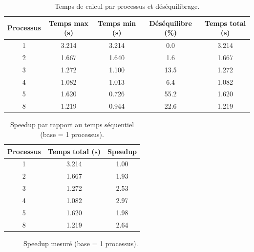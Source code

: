 \documentclass[a4paper,13pt]{book}
\begin{document}
\begin{table}[ht]
  \centering
  \caption{Temps de calcul par processus et déséquilibrage.}
  \label{tab:temps}
  \begin{tabular}{@{}ccccc@{}}
    \toprule
    \textbf{Processus} & \textbf{Temps max (s)} & \textbf{Temps min (s)} & \textbf{Déséquilibre (\%)} & \textbf{Temps total (s)} \\
    \midrule
    1 & 3.214 & 3.214 & 0.0 & 3.214 \\
    \hline
    2 & 1.667 & 1.640 & 1.6 & 1.667 \\
    \hline
    3 & 1.272 & 1.100 & 13.5 & 1.272 \\
    \hline
    4 & 1.082 & 1.013 & 6.4 & 1.082 \\
    \hline
    5 & 1.620 & 0.726 & 55.2 & 1.620 \\
    \hline
    8 & 1.219 & 0.944 & 22.6 & 1.219 \\
    \bottomrule
  \end{tabular}
\end{table}
\begin{table}[ht]
  \centering
  \caption{Speedup par rapport au temps séquentiel (base = 1 processus).}
  \label{tab:speedup}
  \begin{tabular}{@{}ccc@{}}
    \toprule
    \textbf{Processus} & \textbf{Temps total (s)} & \textbf{Speedup} \\
    \midrule
    1 & 3.214 & 1.00 \\
    2 & 1.667 & 1.93 \\
    3 & 1.272 & 2.53 \\
    4 & 1.082 & 2.97 \\
    5 & 1.620 & 1.98 \\
    8 & 1.219 & 2.64 \\
    \bottomrule
  \end{tabular}
\end{table}
\begin{figure}[ht]
  \centering
  \caption{Speedup mesuré  (base = 1 processus).}
  \label{fig:speedup}
\end{figure}
\end{document}
